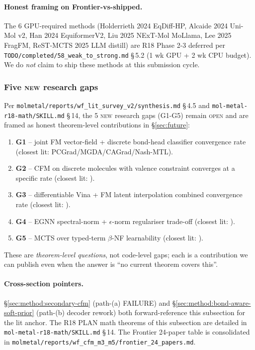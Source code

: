 \paragraph{Honest framing on Frontier-vs-shipped.}
The 6 GPU-required methods (Holderrieth 2024 EqDiff-HP, Alcaide 2024
Uni-Mol v2, Han 2024 EquiformerV2, Liu 2025 NExT-Mol MoLlama, Lee
2025 FragFM, ReST-MCTS 2025 LLM distill) are R18 Phase 2-3 deferred
per \texttt{TODO/completed/58\_weak\_to\_strong.md} \S\,5.2 (1 wk GPU
+ 2 wk CPU budget).  We do \emph{not} claim to ship these methods at
this submission cycle.

\subsubsection{Five \textsc{new} research gaps}
\label{sec:method:frontier-survey-gaps}

Per \texttt{molmetal/reports/wf\_lit\_survey\_v2/synthesis.md} \S\,4.5
and \texttt{mol-metal-r18-math/SKILL.md} \S\,14, the 5 \textsc{new}
research gaps (G1-G5) remain \textsc{open} and are framed as honest
theorem-level contributions in \S\ref{sec:future}:

\begin{enumerate}
\item \textbf{G1} -- joint FM vector-field + discrete bond-head
      classifier convergence rate (closest lit: PCGrad/MGDA/CAGrad/Nash-MTL).
\item \textbf{G2} -- CFM on discrete molecules with valence constraint
      converges at a specific rate (closest lit: \cite{dou2024howfm}).
\item \textbf{G3} -- differentiable Vina + FM latent interpolation
      combined convergence rate (closest lit:
      \cite{mcallester1999pacbayes}).
\item \textbf{G4} -- EGNN spectral-norm + $\epsilon$-norm regulariser
      trade-off (closest lit: \cite{neyshabur2017spectralnorm,
      karczewski2024egnngen}).
\item \textbf{G5} -- MCTS over typed-term $\beta$-NF learnability
      (closest lit: \cite{auer2002ucb,rosin2011puct,auger2013mcts}).
\end{enumerate}

These are \emph{theorem-level questions}, not code-level gaps; each is
a contribution we can publish even when the answer is ``no current
theorem covers this''.

\paragraph{Cross-section pointers.}
\S\ref{sec:method:secondary-cfm} (path-(a) FAILURE) and
\S\ref{sec:method:bond-aware-soft-prior} (path-(b) decoder rework)
both forward-reference this subsection for the lit anchor.  The R18
PLAN math theorems of this subsection are detailed in
\texttt{mol-metal-r18-math/SKILL.md} \S\,14.  The Frontier 24-paper
table is consolidated in
\texttt{molmetal/reports/wf\_cfm\_m3\_m5/frontier\_24\_papers.md}.

